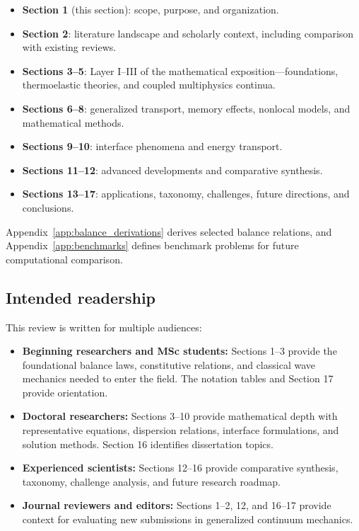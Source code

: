 \begin{itemize}
\item \textbf{Section 1} (this section): scope, purpose, and organization.
\item \textbf{Section 2}: literature landscape and scholarly context, including comparison with existing reviews.
\item \textbf{Sections 3--5}: Layer I--III of the mathematical exposition—foundations, thermoelastic theories, and coupled multiphysics continua.
\item \textbf{Sections 6--8}: generalized transport, memory effects, nonlocal models, and mathematical methods.
\item \textbf{Sections 9--10}: interface phenomena and energy transport.
\item \textbf{Sections 11--12}: advanced developments and comparative synthesis.
\item \textbf{Sections 13--17}: applications, taxonomy, challenges, future directions, and conclusions.
\end{itemize}

Appendix~\ref{app:balance_derivations} derives selected balance relations, and Appendix~\ref{app:benchmarks} defines benchmark problems for future computational comparison.

\subsection{Intended readership}

This review is written for multiple audiences:

\begin{itemize}
\item \textbf{Beginning researchers and MSc students:} Sections 1--3 provide the foundational balance laws, constitutive relations, and classical wave mechanics needed to enter the field. The notation tables and Section 17 provide orientation.
\item \textbf{Doctoral researchers:} Sections 3--10 provide mathematical depth with representative equations, dispersion relations, interface formulations, and solution methods. Section 16 identifies dissertation topics.
\item \textbf{Experienced scientists:} Sections 12--16 provide comparative synthesis, taxonomy, challenge analysis, and future research roadmap.
\item \textbf{Journal reviewers and editors:} Sections 1--2, 12, and 16--17 provide context for evaluating new submissions in generalized continuum mechanics.
\end{itemize}

